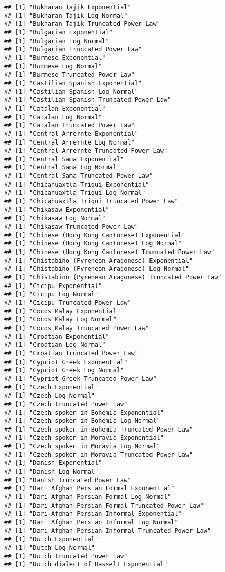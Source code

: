 \documentclass[]{article}
\begin{document}
\begin{verbatim}
## [1] "Bukharan Tajik Exponential"
## [1] "Bukharan Tajik Log Normal"
## [1] "Bukharan Tajik Truncated Power Law"
## [1] "Bulgarian Exponential"
## [1] "Bulgarian Log Normal"
## [1] "Bulgarian Truncated Power Law"
## [1] "Burmese Exponential"
## [1] "Burmese Log Normal"
## [1] "Burmese Truncated Power Law"
## [1] "Castilian Spanish Exponential"
## [1] "Castilian Spanish Log Normal"
## [1] "Castilian Spanish Truncated Power Law"
## [1] "Catalan Exponential"
## [1] "Catalan Log Normal"
## [1] "Catalan Truncated Power Law"
## [1] "Central Arrernte Exponential"
## [1] "Central Arrernte Log Normal"
## [1] "Central Arrernte Truncated Power Law"
## [1] "Central Sama Exponential"
## [1] "Central Sama Log Normal"
## [1] "Central Sama Truncated Power Law"
## [1] "Chicahuaxtla Triqui Exponential"
## [1] "Chicahuaxtla Triqui Log Normal"
## [1] "Chicahuaxtla Triqui Truncated Power Law"
## [1] "Chikasaw Exponential"
## [1] "Chikasaw Log Normal"
## [1] "Chikasaw Truncated Power Law"
## [1] "Chinese (Hong Kong Cantonese) Exponential"
## [1] "Chinese (Hong Kong Cantonese) Log Normal"
## [1] "Chinese (Hong Kong Cantonese) Truncated Power Law"
## [1] "Chistabino (Pyrenean Aragonese) Exponential"
## [1] "Chistabino (Pyrenean Aragonese) Log Normal"
## [1] "Chistabino (Pyrenean Aragonese) Truncated Power Law"
## [1] "Cicipu Exponential"
## [1] "Cicipu Log Normal"
## [1] "Cicipu Truncated Power Law"
## [1] "Cocos Malay Exponential"
## [1] "Cocos Malay Log Normal"
## [1] "Cocos Malay Truncated Power Law"
## [1] "Croatian Exponential"
## [1] "Croatian Log Normal"
## [1] "Croatian Truncated Power Law"
## [1] "Cypriot Greek Exponential"
## [1] "Cypriot Greek Log Normal"
## [1] "Cypriot Greek Truncated Power Law"
## [1] "Czech Exponential"
## [1] "Czech Log Normal"
## [1] "Czech Truncated Power Law"
## [1] "Czech spoken in Bohemia Exponential"
## [1] "Czech spoken in Bohemia Log Normal"
## [1] "Czech spoken in Bohemia Truncated Power Law"
## [1] "Czech spoken in Moravia Exponential"
## [1] "Czech spoken in Moravia Log Normal"
## [1] "Czech spoken in Moravia Truncated Power Law"
## [1] "Danish Exponential"
## [1] "Danish Log Normal"
## [1] "Danish Truncated Power Law"
## [1] "Dari Afghan Persian Formal Exponential"
## [1] "Dari Afghan Persian Formal Log Normal"
## [1] "Dari Afghan Persian Formal Truncated Power Law"
## [1] "Dari Afghan Persian Informal Exponential"
## [1] "Dari Afghan Persian Informal Log Normal"
## [1] "Dari Afghan Persian Informal Truncated Power Law"
## [1] "Dutch Exponential"
## [1] "Dutch Log Normal"
## [1] "Dutch Truncated Power Law"
## [1] "Dutch dialect of Hasselt Exponential"

\end{verbatim}
\end{document}
